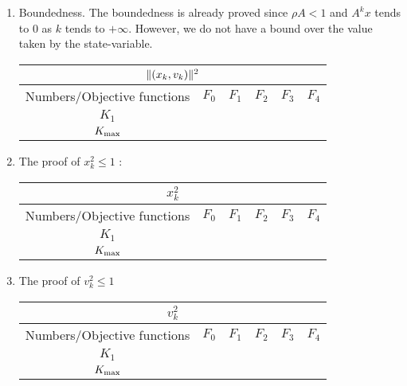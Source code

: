 \documentclass[10pt]{article}
\begin{document}
\begin{enumerate}
\item Boundedness. The boundedness is already proved since $\rho{A}<1$ and $A^k x$ tends to 0 as $k$ tends to $+\infty$. However, we do not have a bound over the value taken by the state-variable.  
\begin{center}
\begin{tabular}{|c|c|c|c|c|c|}
\hline
\multicolumn{6}{|c|}{$\| (x_k,v_k)\|^2$}\\
\hline
Numbers/Objective functions & $F_0$ & $F_{1}$ & $F_{2}$ & $F_3$ & $F_4$ \\
\hline
$K_1$ & & & & & \\
\hline
 $K_{\rm max}$ & & & & & \\
\hline
\end{tabular}
\end{center} 
 
\item The proof of $x_{k}^2\leq 1$ : 

\begin{center}
\begin{tabular}{|c|c|c|c|c|c|}
\hline
\multicolumn{6}{|c|}{$x_k^2$}\\
\hline
Numbers/Objective functions & $F_0$ & $F_{1}$ & $F_{2}$ & $F_3$ & $F_4$ \\
\hline
$K_1$ & & & & & \\
\hline
 $K_{\rm max}$ & & & & & \\
\hline
\end{tabular}
\end{center}

\item The proof of $v_{k}^2\leq 1$ 

\begin{center}
\begin{tabular}{|c|c|c|c|c|c|}
\hline
\multicolumn{6}{|c|}{$v_k^2$}\\
\hline
Numbers/Objective functions & $F_0$ & $F_{1}$ & $F_{2}$ & $F_3$ & $F_4$ \\
\hline
$K_1$ & & & & & \\
\hline
 $K_{\rm max}$ & & & & & \\
\hline
\end{tabular}
\end{center}
\end{enumerate}
\end{document}
